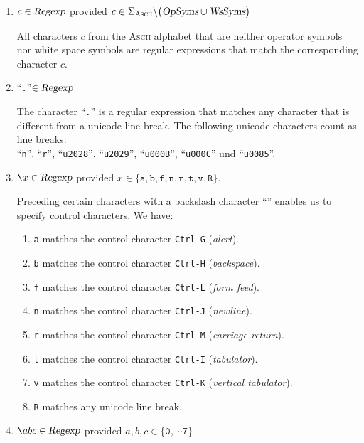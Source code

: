 \begin{enumerate}
\item $c \in \textsl{Regexp}$ \quad provided $c \in \Sigma_{\textsc{\scriptsize Ascii}}
       \backslash \bigl(\textsl{OpSyms} \cup \textsl{WsSyms}\bigr)$

      All characters $c$  from the \textsc{Ascii} alphabet that are neither operator symbols nor
      white space symbols are regular expressions that match the corresponding character $c$.
\item ``\texttt{.}''$\in \textsl{Regexp}$

      The character ``\texttt{.}'' is a regular expression that matches any character that is different
      from a unicode line break.  The following unicode characters count as line breaks:
      \\[0.2cm]
      \hspace*{1.3cm}
       ``\texttt{n}'', ``\texttt{r}'',
       ``\texttt{u2028}'',
       ``\texttt{u2029}'',
       ``\texttt{u000B}'',
       ``\texttt{u000C}'' und
       ``\texttt{u0085}''.
\item $\texttt{\symbol{92}}x \in \textsl{Regexp}$ \quad provided $x \in \{ \texttt{a}, \texttt{b}, \texttt{f}, \texttt{n}, \texttt{r}, \texttt{t},
      \texttt{v}, \texttt{R} \}$. 

      Preceding certain characters with a backslash character ``\texttt{}'' enables us to
      specify control characters.  We have:
      \begin{enumerate}
      \item \texttt{a} matches the control character \texttt{Ctrl-G} (\emph{alert}).
      \item \texttt{b} matches the control character \texttt{Ctrl-H} (\emph{backspace}).
      \item \texttt{f} matches the control character \texttt{Ctrl-L} (\emph{form feed}).
      \item \texttt{n} matches the control character \texttt{Ctrl-J} (\emph{newline}).
      \item \texttt{r} matches the control character \texttt{Ctrl-M} (\emph{carriage return}).
      \item \texttt{t} matches the control character \texttt{Ctrl-I} (\emph{tabulator}).
      \item \texttt{v} matches the control character \texttt{Ctrl-K} (\emph{vertical tabulator}).
      \item \texttt{R} matches any unicode line break.
      \end{enumerate}
\item $\texttt{\symbol{92}}abc \in \textsl{Regexp}$ \quad provided $a,b,c \in \{ \texttt{0}, \cdots \texttt{7} \}$ 


\end{enumerate}
